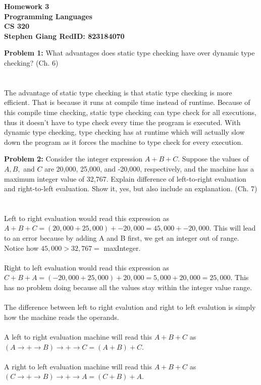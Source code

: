 \documentclass[11pt]{article}
\newcommand{\skipline}{\vspace{\baselineskip}}
\newenvironment{problem}[1]{\textbf{Problem #1: }}{\newpage}
\begin{document}
	
	\begin{center}
		\textbf{Homework 3} \\
		\textbf{Programming Languages} \\
		\textbf{CS 320} \\
		\textbf{Stephen Giang RedID: 823184070} \\
		\skipline \skipline
	\end{center}
	
	\begin{problem}{1}
		What advantages does static type checking have over dynamic type checking? (Ch. 6)
		\\ \\ \\
		The advantage of static type checking is that static type checking is more efficient.  That is because it runs at compile time instead of runtime.  Because of this compile time checking, static type checking can type check for all executions, thus it doesn’t have to type check every time the program is executed. With dynamic type checking, type checking has at runtime which will actually slow down the program as it forces the machine to type check for every execution.  
	\end{problem}
	
	\begin{problem}{2}
		Consider the integer expression $A + B + C$.  Suppose the values of $A, B,$ and $C$ are 20,000, 25,000, and -20,000, respectively, and the machine has a maximum integer value of 32,767.  Explain difference of left-to-right evaluation and right-to-left evaluation.  Show it, yes, but also include an explanation. (Ch. 7)
		\\ \\ \\ 
		Left to right evaluation would read this expression as $A + B + C = (20,000 + 25,000) + -20,000 = 45,000 + -20,000$.  This will lead to an error because by adding A and B first, we get an integer out of range.  Notice how $45,000 > 32,767 =$ maxInteger. 
		\\ \\ 
		Right to left evaluation would read this expression as $C + B + A = (-20,000 + 25,000) + 20,000 = 5,000 + 20,000 = 25,000$.  This has no problem doing because all the values stay within the integer value range. 
		\\ \\
		The difference between left to right evalution and right to left evalution is simply how the machine reads the operands.  
		\\ \\
		A left to right evaluation machine will read this $A + B + C$ as $(A \rightarrow + \rightarrow B) \rightarrow + \rightarrow C = (A + B) + C$.  
		\\ \\
		A right to left evaluation machine will read this $A + B+ C$ as $(C \rightarrow + \rightarrow B) \rightarrow + \rightarrow A = (C + B) + A$.
		
	\end{problem}
	
\end{document}
